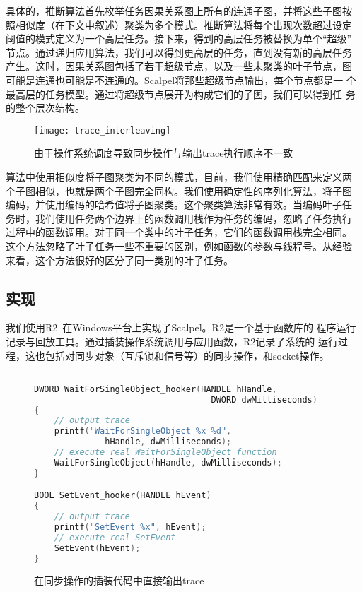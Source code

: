 具体的，推断算法首先枚举任务因果关系图上所有的连通子图，并将这些子图按
照相似度（在下文中叙述）聚类为多个模式。推断算法将每个出现次数超过设定
阈值的模式定义为一个高层任务。接下来，得到的高层任务被替换为单个“超级”
节点。通过递归应用算法，我们可以得到更高层的任务，直到没有新的高层任务
产生。这时，因果关系图包括了若干超级节点，以及一些未聚类的叶子节点，图
可能是连通也可能是不连通的。Scalpel将那些超级节点输出，每个节点都是一
个最高层的任务模型。通过将超级节点展开为构成它们的子图，我们可以得到任
务的整个层次结构。

\begin{figure}[htbp]
  \centering
  \begin{minipage}{0.8\linewidth}
    \centering
    \texttt{[image: trace\_interleaving]}
    \caption{由于操作系统调度导致同步操作与输出trace执行顺序不一致}
    \label{fig:trace_interleaving}
  \end{minipage}
\end{figure}

算法中使用相似度将子图聚类为不同的模式，目前，我们使用精确匹配来定义两
个子图相似，也就是两个子图完全同构。我们使用确定性的序列化算法，将子图
编码，并使用编码的哈希值将子图聚类。这个聚类算法非常有效。当编码叶子任
务时，我们使用任务两个边界上的函数调用栈作为任务的编码，忽略了任务执行
过程中的函数调用。对于同一个类中的叶子任务，它们的函数调用栈完全相同。
这个方法忽略了叶子任务一些不重要的区别，例如函数的参数与线程号。从经验
来看，这个方法很好的区分了同一类别的叶子任务。



\subsection{实现}

我们使用R2~\cite{r2}在Windows平台上实现了Scalpel。R2是一个基于函数库的
程序运行记录与回放工具。通过插装操作系统调用与应用函数，R2记录了系统的
运行过程，这也包括对同步对象（互斥锁和信号等）的同步操作，和socket操作。

\begin{figure}[htbp]
\centering
\begin{lstlisting}[language=C++]

DWORD WaitForSingleObject_hooker(HANDLE hHandle,
                                   DWORD dwMilliseconds)
{
    // output trace
    printf("WaitForSingleObject %x %d",
              hHandle, dwMilliseconds);
    // execute real WaitForSingleObject function
    WaitForSingleObject(hHandle, dwMilliseconds);
}

BOOL SetEvent_hooker(HANDLE hEvent)
{
    // output trace
    printf("SetEvent %x", hEvent);
    // execute real SetEvent
    SetEvent(hEvent);
}
\end{lstlisting}
\caption{在同步操作的插装代码中直接输出trace}
\label{fig:trace_direct}
\end{figure}

